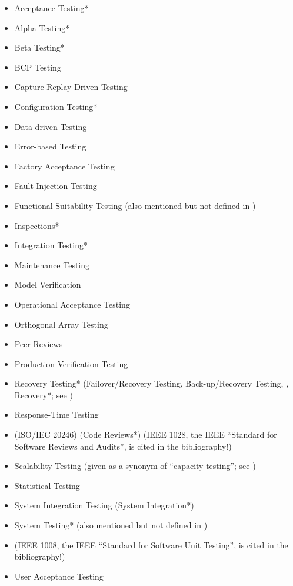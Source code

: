     \begin{itemize}
        \item \underline{Acceptance Testing*}
        \item Alpha Testing*
        \item Beta Testing*
        \item BCP Testing
        \item Capture-Replay Driven Testing
        \item Configuration Testing*
        \item Data-driven Testing
        \item Error-based Testing
        \item Factory Acceptance Testing
        \item Fault Injection Testing
        \item Functional Suitability Testing (also mentioned but not defined in
              \citep{IEEE2017})
        \item Inspections*
        \item \underline{Integration Testing}*
        \item Maintenance Testing
        \item Model Verification
        \item Operational Acceptance Testing
        \item Orthogonal Array Testing
        \item Peer Reviews
        \item Production Verification Testing
        \item Recovery Testing* (Failover/Recovery Testing, Back-up/Recovery
              Testing, ,
              Recovery*; see )
        \item Response-Time Testing
        \item {} (ISO/IEC 20246) (Code Reviews*)
              (IEEE 1028, the IEEE ``Standard for Software Reviews and Audits'',
              is cited in the bibliography!)
        \item Scalability Testing (given as a synonym of ``capacity
              testing''; see )
        \item Statistical Testing
        \item System Integration Testing (System Integration*)
        \item System Testing* (also mentioned but not defined in \citep{IEEE2013})
        \item {}
              (IEEE 1008, the IEEE ``Standard for Software Unit Testing'',
              is cited in the bibliography!)
        \item User Acceptance Testing
    \end{itemize}
\fi


